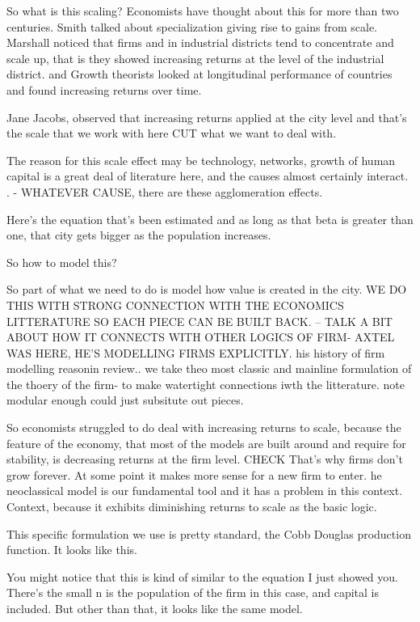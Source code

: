 So what is this  scaling?
Economists have thought about this for more than two centuries. Smith talked about specialization giving rise to gains from scale. 
Marshall noticed that firms and in industrial districts tend to concentrate and scale up, that is they showed increasing returns at the level of the industrial district. 
and Growth theorists looked at longitudinal performance of countries and found increasing returns over time.

Jane Jacobs, observed that increasing returns applied at the city level and that's the scale that we work with here CUT what we want to deal with.

The reason for this scale effect may be technology, networks, growth of human capital is a great deal of literature here, and the causes almost certainly interact. . - WHATEVER CAUSE, there are these agglomeration effects. 

Here's the equation that's been estimated and as long as that beta is greater than one, that city gets bigger as the population increases.

So how to model this?

So part of what we need to do is model how value is created in the city. 
WE DO THIS WITH STRONG CONNECTION WITH THE ECONOMICS LITTERATURE SO EACH PIECE CAN BE BUILT BACK. -- 
TALK A BIT ABOUT HOW IT CONNECTS WITH OTHER LOGICS OF FIRM- AXTEL WAS HERE, HE'S MODELLING FIRMS EXPLICITLY. 
his history of firm modelling reasonin review..
we take theo most classic and mainline formulation of the thoery of the firm- to make watertight connections iwth the litterature. note modular enough could just subsitute out pieces. 

So economists struggled to do deal with increasing returns to scale, because the feature of the economy, that most of the models are built around and require for stability, is decreasing returns at the firm level. CHECK That's why firms don't grow forever.  At some point it makes more sense for a new firm to enter.
he neoclassical model is our fundamental tool and it has a problem in this context. Context, because it exhibits diminishing returns to scale as the basic logic.

This specific formulation we use is pretty standard, the Cobb Douglas production function.  It looks like this.

You might notice that this is kind of similar to the equation I just showed you. There's the small n is the population of the firm in this case, and capital is included. But other than that, it looks like the same model. 

